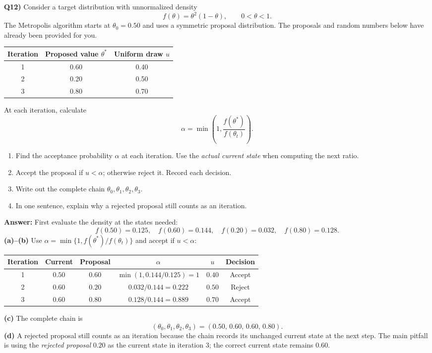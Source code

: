 \documentclass[12pt]{article}
\newenvironment{solution}{\par\smallskip\begingroup\color{blue}\noindent\textbf{Answer: }\smallskip}{\par\endgroup\medskip}
\newcommand{\question}[2]{\vspace{0.7em}\noindent\textbf{Q#1)}}
\begin{document}
\question{12}{}
Consider a target distribution with unnormalized density
\[
f(\theta)=\theta^2(1-\theta),\qquad 0<\theta<1.
\]
The Metropolis algorithm starts at $\theta_0=0.50$ and uses a symmetric proposal distribution. The proposals and random numbers below have already been provided for you.
\begin{center}
\begin{tabular}{ccc}
\toprule
Iteration & Proposed value $\theta^*$ & Uniform draw $u$\\
\midrule
1 & 0.60 & 0.40\\
2 & 0.20 & 0.50\\
3 & 0.80 & 0.70\\
\bottomrule
\end{tabular}
\end{center}
At each iteration, calculate
\[
\alpha=\min\left(1,\frac{f(\theta^*)}{f(\theta_{t})}\right).
\]
\begin{enumerate}[label=(\alph*),nosep]
\item Find the acceptance probability $\alpha$ at each iteration. Use the \emph{actual current state} when computing the next ratio.
\item Accept the proposal if $u<\alpha$; otherwise reject it. Record each decision.
\item Write out the complete chain $\theta_0,\theta_1,\theta_2,\theta_3$.
\item In one sentence, explain why a rejected proposal still counts as an iteration.
\end{enumerate}

\begin{solution}
First evaluate the density at the states needed:
\[f(0.50)=0.125,\quad f(0.60)=0.144,\quad f(0.20)=0.032,\quad f(0.80)=0.128.\]
\textbf{(a)--(b)} Use $\alpha=\min\{1,f(\theta^*)/f(\theta_t)\}$ and accept if $u<\alpha$:
\begin{center}
\begin{tabular}{cccccc}
\toprule
Iteration & Current & Proposal & $\alpha$ & $u$ & Decision\\
\midrule
1 & $0.50$ & $0.60$ & $\min(1,0.144/0.125)=1$ & $0.40$ & Accept\\
2 & $0.60$ & $0.20$ & $0.032/0.144=0.222$ & $0.50$ & Reject\\
3 & $0.60$ & $0.80$ & $0.128/0.144=0.889$ & $0.70$ & Accept\\
\bottomrule
\end{tabular}
\end{center}
\textbf{(c)} The complete chain is
\[\boxed{(\theta_0,\theta_1,\theta_2,\theta_3)=(0.50,\,0.60,\,0.60,\,0.80).}\]
\textbf{(d)} A rejected proposal still counts as an iteration because the chain records its unchanged current state at the next step.
The main pitfall is using the \emph{rejected proposal} $0.20$ as the current state in iteration 3; the correct current state remains $0.60$.
\end{solution}
\end{document}
